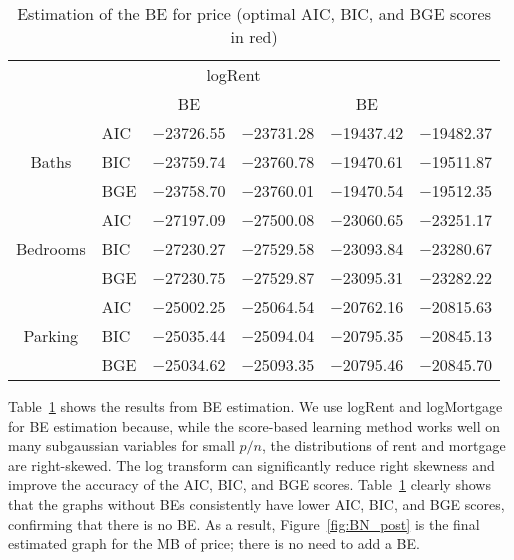 \documentclass[11pt,review,authoryear]{elsarticle}
\begin{document}
\begin{table}[H]
  \renewcommand*{\arraystretch}{0.8}
  \small
  \centering
  \caption{Estimation of the BE for price (optimal AIC, BIC, and BGE scores in red)}
  \label{Table:Backdoor}
  \begin{tabular}{cll>{\color{red}}ll>{\color{red}}l}
    \toprule
    & & \multicolumn{2}{c}{logRent} & \multicolumn{2}{c}{logMortgage} \\
    \cmidrule(lr){3-4} \cmidrule(lr){5-6}
    & & \multicolumn{1}{c}{BE} & \multicolumn{1}{c}{No BE}
      & \multicolumn{1}{c}{BE} & \multicolumn{1}{c}{No BE} \\
    \midrule
             & AIC & $-$23726.55 & $-$23731.28 & $-$19437.42 & $-$19482.37 \\
    Baths    & BIC & $-$23759.74 & $-$23760.78 & $-$19470.61 & $-$19511.87 \\
             & BGE & $-$23758.70 & $-$23760.01 & $-$19470.54 & $-$19512.35 \\
    \cmidrule{1-6}
             & AIC & $-$27197.09 & $-$27500.08 & $-$23060.65 & $-$23251.17 \\
    Bedrooms & BIC & $-$27230.27 & $-$27529.58 & $-$23093.84 & $-$23280.67 \\
             & BGE & $-$27230.75 & $-$27529.87 & $-$23095.31 & $-$23282.22 \\
    \cmidrule{1-6}
             & AIC & $-$25002.25 & $-$25064.54 & $-$20762.16 & $-$20815.63 \\
    Parking  & BIC & $-$25035.44 & $-$25094.04 & $-$20795.35 & $-$20845.13 \\
             & BGE & $-$25034.62 & $-$25093.35 & $-$20795.46 & $-$20845.70 \\
  \bottomrule
  \end{tabular}
\end{table}

Table~\ref{Table:Backdoor} shows the results from BE estimation. We use logRent and logMortgage for BE estimation because, while the score-based learning method works well on many subgaussian variables for small $p/n$, the distributions of rent and mortgage are right-skewed. The log transform can significantly reduce right skewness and improve the accuracy of the AIC, BIC, and BGE scores. Table~\ref{Table:Backdoor} clearly shows that the graphs without BEs consistently have lower AIC, BIC, and BGE scores, confirming that there is no BE. As a result, Figure~\ref{fig:BN_post} is the final estimated graph for the MB of price; there is no need to add a BE.
\end{document}
